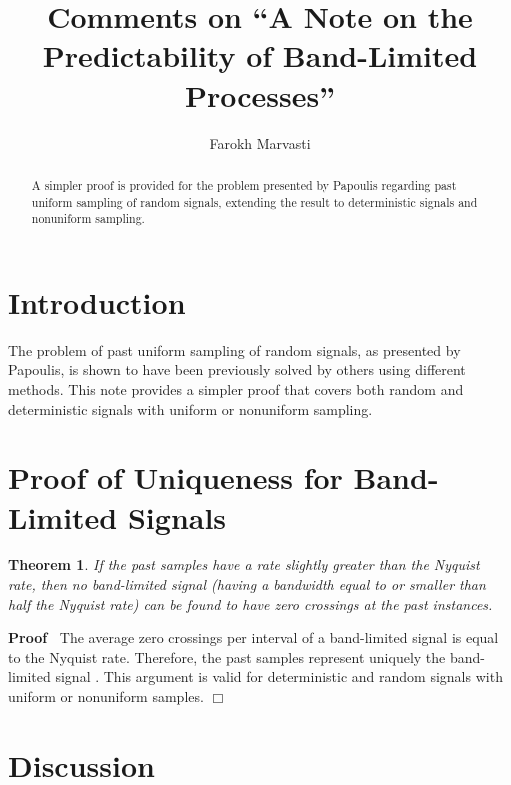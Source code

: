 \documentclass{article}
\newenvironment{proof}{\noindent\textbf{Proof\ }}{\hspace*{\fill}$\Box$\medskip}
\newtheorem{theorem}{Theorem}
\begin{document}
\title{Comments on ``A Note on the Predictability of Band-Limited Processes''}

\author{Farokh Marvasti}

\date{}

\maketitle

\begin{abstract}
  A simpler proof is provided for the problem presented by Papoulis regarding
  past uniform sampling of random signals, extending the result to
  deterministic signals and nonuniform sampling.
\end{abstract}

\section{Introduction}

The problem of past uniform sampling of random signals, as presented by
Papoulis{\cite{papoulis1985}}, is shown to have been previously solved by
others using different methods. This note provides a simpler proof that covers
both random and deterministic signals with uniform or nonuniform sampling.

\section{Proof of Uniqueness for Band-Limited Signals}

\begin{theorem}
  \label{thm:uniqueness}If the past samples have a rate slightly greater than
  the Nyquist rate, then no band-limited signal (having a bandwidth equal to
  or smaller than half the Nyquist rate) can be found to have zero crossings
  at the past instances.
\end{theorem}

\begin{proof}
  The average zero crossings per interval of a band-limited signal is equal to
  the Nyquist rate. Therefore, the past samples represent uniquely the
  band-limited signal {\cite{requicha1980}}. This argument is valid for
  deterministic and random signals with uniform or nonuniform samples.
\end{proof}

\section{Discussion}
\end{document}
